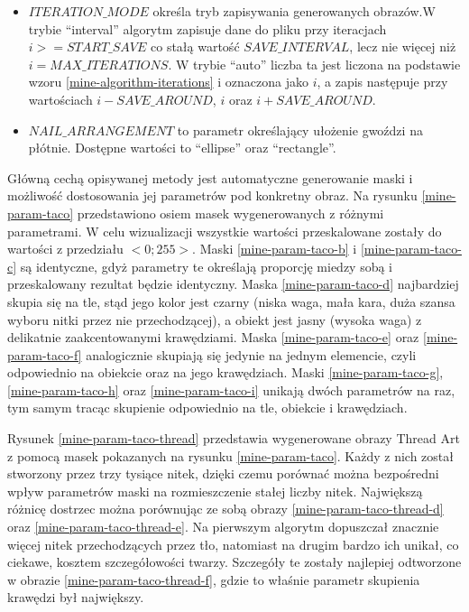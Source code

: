 \documentclass[a4paper, 12pt, polish, twoside]{extreport}
\begin{document}
\begin{itemize}
        \item \(ITERATION\_MODE\) określa tryb zapisywania generowanych obrazów.\linebreak W trybie ``interval'' algorytm zapisuje dane do pliku przy iteracjach\linebreak \(i >= START\_SAVE\) co stałą wartość \(SAVE\_INTERVAL\), lecz nie więcej niż \(i = MAX\_ITERATIONS\). W trybie ``auto'' liczba ta jest liczona na podstawie wzoru \ref{mine-algorithm-iterations} i oznaczona jako \(i\), a zapis następuje przy wartościach \(i - SAVE\_AROUND\), \(i\) oraz \(i + SAVE\_AROUND\).
        \item \(NAIL\_ARRANGEMENT\) to parametr określający ułożenie gwoździ na płótnie. Dostępne wartości to ``ellipse'' oraz ``rectangle''.
    \end{itemize}
    
    Główną cechą opisywanej metody jest automatyczne generowanie maski i możliwość dostosowania jej parametrów pod konkretny obraz. Na rysunku \ref{mine-param-taco} przedstawiono osiem masek wygenerowanych z różnymi parametrami. W celu wizualizacji wszystkie wartości przeskalowane zostały do wartości z przedziału \(<0;255>\). Maski \ref{mine-param-taco-b} i \ref{mine-param-taco-c} są identyczne, gdyż parametry te określają proporcję miedzy sobą i przeskalowany rezultat będzie identyczny. Maska \ref{mine-param-taco-d} najbardziej skupia się na tle, stąd jego kolor jest czarny (niska waga, mała kara, duża szansa wyboru nitki przez nie przechodzącej), a obiekt jest jasny (wysoka waga) z delikatnie zaakcentowanymi krawędziami. Maska \ref{mine-param-taco-e} oraz \ref{mine-param-taco-f} analogicznie skupiają się jedynie na jednym elemencie, czyli odpowiednio na obiekcie oraz na jego krawędziach. Maski \ref{mine-param-taco-g}, \ref{mine-param-taco-h} oraz \ref{mine-param-taco-i} unikają dwóch parametrów na raz, tym samym tracąc skupienie odpowiednio na tle, obiekcie i krawędziach.
    
    Rysunek \ref{mine-param-taco-thread} przedstawia wygenerowane obrazy Thread Art z pomocą masek pokazanych na rysunku \ref{mine-param-taco}. Każdy z nich został stworzony przez trzy tysiące nitek, dzięki czemu porównać można bezpośredni wpływ parametrów maski na rozmieszczenie stałej liczby nitek. Największą różnicę dostrzec można porównując ze sobą obrazy \ref{mine-param-taco-thread-d} oraz \ref{mine-param-taco-thread-e}. Na pierwszym algorytm dopuszczał znacznie więcej nitek przechodzących przez tło, natomiast na drugim bardzo ich unikał, co ciekawe, kosztem szczegółowości twarzy. Szczegóły te zostały najlepiej odtworzone w obrazie \ref{mine-param-taco-thread-f}, gdzie to właśnie parametr skupienia krawędzi był największy.
\end{document}
